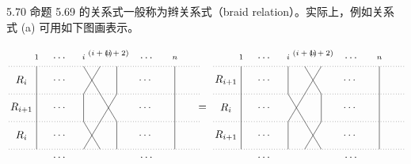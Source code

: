 
\begin{remark}{5.70} 命题 5.69 的关系式一般称为辫关系式（braid relation）。实际上，例如关系式 (a) 可用如下图画表示。\end{remark}

\[
\begin{tikzpicture}[scale=0.92, baseline=(current bounding box.center)]
  \foreach \y in {0,1,2,3} {\draw[dotted] (-1.0,\y) -- (5.9,\y);}
  \draw (0,0) -- (0,3);
  \draw (5.0,0) -- (5.0,3);
  \foreach \yb/\xa/\xb/\xc in {2/1.7/2.3/2.9, 1/2.3/2.9/1.7, 0/1.7/2.3/2.9}{
    \draw (\xa,\yb+1) .. controls (\xa+0.13,\yb+0.78) and (\xb-0.13,\yb+0.22) .. (\xb,\yb);
    \draw (\xb,\yb+1) .. controls (\xb-0.13,\yb+0.78) and (\xa+0.13,\yb+0.22) .. (\xa,\yb);
    \draw (\xc,\yb) -- (\xc,\yb+1);
  }
  \node at (-0.55,2.5) {$R_{i}$};
  \node at (-0.55,1.5) {$R_{i+1}$};
  \node at (-0.55,0.5) {$R_{i}$};
  \node[above] at (0,3.12) {\scriptsize $1$};
  \node[above] at (1.7,3.12) {\scriptsize $i$};
  \node[above] at (2.3,3.2) {\scriptsize $(i+1)$};
  \node[above] at (2.9,3.2) {\scriptsize $(i+2)$};
  \node[above] at (5.0,3.12) {\scriptsize $n$};
  \node at (0.85,3.3) {$\cdots$};
  \node at (4.0,3.3) {$\cdots$};
  \node at (0.85,-0.3) {$\cdots$};
  \node at (4.0,-0.3) {$\cdots$};
  \foreach \yb in {0,1,2}{
    \node at (0.85,\yb+0.5) {$\cdots$};
    \node at (3.95,\yb+0.5) {$\cdots$};
  }
  \node at (6.0,1.5) {$=$};
  \begin{scope}[xshift=7.4cm]
  \foreach \y in {0,1,2,3} {\draw[dotted] (-1.0,\y) -- (5.9,\y);}
  \draw (0,0) -- (0,3);
  \draw (5.0,0) -- (5.0,3);
  \foreach \yb/\xa/\xb/\xc in {2/2.3/2.9/1.7, 1/1.7/2.3/2.9, 0/2.3/2.9/1.7}{
    \draw (\xa,\yb+1) .. controls (\xa+0.13,\yb+0.78) and (\xb-0.13,\yb+0.22) .. (\xb,\yb);
    \draw (\xb,\yb+1) .. controls (\xb-0.13,\yb+0.78) and (\xa+0.13,\yb+0.22) .. (\xa,\yb);
    \draw (\xc,\yb) -- (\xc,\yb+1);
  }
  \node at (-0.55,2.5) {$R_{i+1}$};
  \node at (-0.55,1.5) {$R_{i}$};
  \node at (-0.55,0.5) {$R_{i+1}$};
  \node[above] at (0,3.12) {\scriptsize $1$};
  \node[above] at (1.7,3.12) {\scriptsize $i$};
  \node[above] at (2.3,3.2) {\scriptsize $(i+1)$};
  \node[above] at (2.9,3.2) {\scriptsize $(i+2)$};
  \node[above] at (5.0,3.12) {\scriptsize $n$};
  \node at (0.85,3.3) {$\cdots$};
  \node at (4.0,3.3) {$\cdots$};
  \node at (0.85,-0.3) {$\cdots$};
  \node at (4.0,-0.3) {$\cdots$};
  \foreach \yb in {0,1,2}{
    \node at (0.85,\yb+0.5) {$\cdots$};
    \node at (3.95,\yb+0.5) {$\cdots$};
  }
  \end{scope}
\end{tikzpicture}
\]
